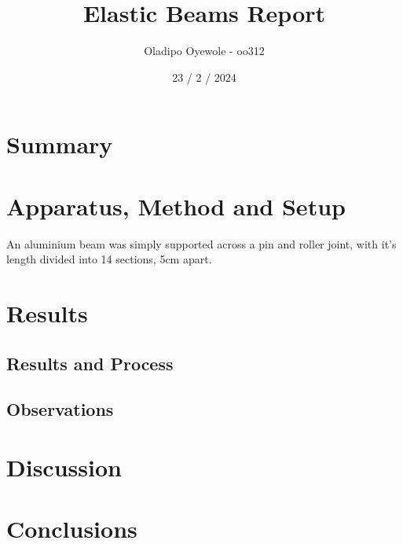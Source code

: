 \documentclass{article}
\title{Elastic Beams Report}
\author{Oladipo Oyewole - oo312}
\date{23 / 2 / 2024}
\begin{document}
\maketitle
\section{Summary}
\section{Apparatus, Method and Setup}
An aluminium beam was simply supported across a pin and roller joint, with it's length divided into 14 sections, 5cm apart. 
\section{Results}
\subsection{Results and Process}
\subsection{Observations}
\section{Discussion}
\section{Conclusions}
\end{document}
